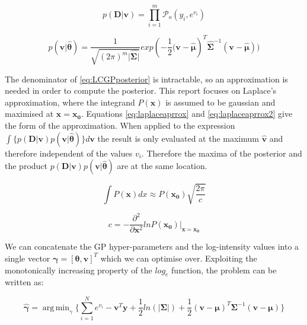 \documentclass[a4paper,11pt]{report}
\DeclareMathOperator*{\argmin}{arg\,min}
\begin{document}
\singlespacing

\begin{equation} \label{eq:LGCPlikelihood}
p(\mathbf{D|v}) = \prod_{i=1}^{m} \mathcal{P}_o (y_i, e^{v_i})
\end{equation}

\begin{equation}
p(\mathbf{v}|\hat{\boldsymbol{\theta}}) = \frac{1}{\sqrt{(2\pi)^{m} |\hat{\boldsymbol{\Sigma|}}}} exp(- \frac{1}{2} \mathbf{(v}-\hat{\boldsymbol{\mu}})^{T}\hat{\boldsymbol{\Sigma}}^{-1}(\mathbf{v}-\hat{\boldsymbol{\mu}}))
\end{equation}

\doublespacing

The denominator of \ref{eq:LCGPposterior} is intractable, so an approximation is needed in order to compute the posterior. This report focuses on Laplace's approximation, where the integrand \(P(\mathbf{x})\) is assumed to be gaussian and maximised at \(\mathbf{x=x_0}\). Equations \ref{eq:laplaceaprrox} and \ref{eq:laplaceaprrox2} give the form of the approximation. \cite{Mackay} When applied to the expression \(\int{\{p(\mathbf{D|v}) p(\mathbf{v}|\hat{\boldsymbol{\theta}})\} d\mathbf{v}} \) the result is only evaluated at the maximum \(\hat{\mathbf{v}}\) and therefore independent of the values \(v_i\). Therefore the maxima of the posterior and the product \(p(\mathbf{D|v}) p(\mathbf{v}|\hat{\boldsymbol{\theta}})\) are at the same location.

\singlespacing

\begin{equation} \label{eq:laplaceaprrox}
\int{P(\mathbf{x}) dx} \approx P(\mathbf{x_0}) \sqrt{\frac{2\pi}{c}}
\end{equation} 

\begin{equation} \label{eq:laplaceaprrox2}
c = - \frac{\partial^2}{\partial \mathbf{x}^2} ln P(\mathbf{x_0}) |_{\mathbf{x}=\mathbf{x_0}}
\end{equation}

\doublespacing 

We can concatenate the GP hyper-parameters and the log-intensity values into a single vector \( \boldsymbol{\gamma} = [\boldsymbol{\theta}, \mathbf{v}]^{T}\) which we can optimise over. Exploiting the monotonically increasing property of the \(log_e\) function, the problem can be written as:

\begin{equation} \label{eq:GPfmin}
\hat{\boldsymbol{\gamma}} = \argmin_\gamma{\{ \sum_{i=1}^{N}e^{v_i} - \mathbf{v}^{T}\mathbf{y} + \frac{1}{2}ln(|\boldsymbol{\Sigma}|) + \frac{1}{2}(\mathbf{v}-\boldsymbol{\mu})^{T}\boldsymbol{\Sigma}^{-1}(\mathbf{v}-\boldsymbol{\mu})\}}
\end{equation}
\end{document}
